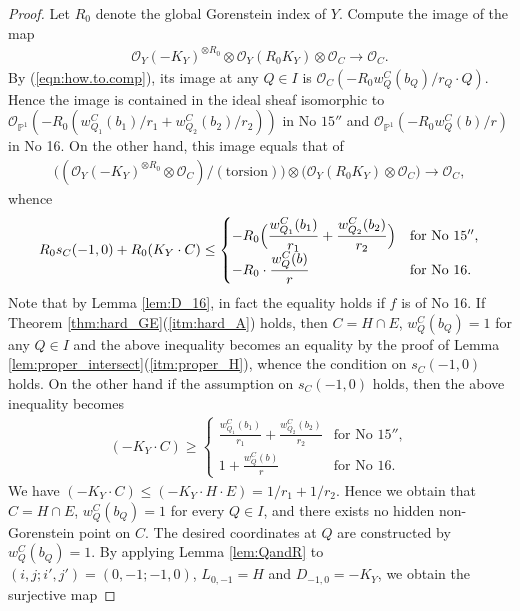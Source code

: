 \documentclass[a4paper,11pt]{amsart}
\theoremstyle{definition}
\theoremstyle{remark}
\numberwithin{equation}{section}
\newcommand{\bP}{{\mathbb P}}
\newcommand{\cO}{{\mathcal O}}
\newcommand{\torsion}{\mathrm{torsion}}
\begin{document}
\begin{proof}
Let $R_0$ denote the global Gorenstein index of $Y$.
Compute the image of the map
\begin{align*}
\cO_Y(-K_Y)^{\otimes R_0} \otimes \cO_Y(R_0K_Y) \otimes \cO_C \to \cO_C.
\end{align*}
By (\ref{eqn:how.to.comp}),
its image at any $Q \in I$ is $\cO_C(-R_0w_{Q}^C(b_Q)/r_Q \cdot Q)$.
Hence the image is contained in the ideal sheaf isomorphic to
$\cO_{\bP^1}(-R_0(w_{Q_1}^C(b_1)/r_1+w_{Q_2}^C(b_2)/r_2))$
in No $\textrm{15}''$ and $\cO_{\bP^1}(-R_0w_Q^C(b)/r)$ in No 16.
On the other hand, this image equals that of
\begin{align*}
\bigl((\cO_Y(-K_Y)^{\otimes R_0} \otimes \cO_C)/(\torsion)\bigr)
\otimes \bigl(\cO_Y(R_0K_Y) \otimes \cO_C\bigr) \to \cO_C,
\end{align*}
whence
\begin{align*}
R_0s_C(-1,0)+R_0(K_Y \cdot C)\le
\begin{cases}
\displaystyle
-R_0\Bigl(\frac{w_{Q_1}^C(b_1)}{r_1}+\frac{w_{Q_2}^C(b_2)}{r_2}\Bigr) &
\textrm{for No $\textrm{15}''$}, \\
\displaystyle -R_0 \cdot \frac{w_Q^C(b)}{r} &
\textrm{for No 16}.
\end{cases}
\end{align*}
Note that by Lemma \ref{lem:D_16},
in fact the equality holds if $f$ is of No 16.
If Theorem \ref{thm:hard_GE}(\ref{itm:hard_A}) holds,
then $C=H \cap E$, $w_Q^C(b_Q)=1$ for any $Q \in I$
and the above inequality becomes an equality
by the proof of Lemma \ref{lem:proper_intersect}(\ref{itm:proper_H}),
whence the condition on $s_C(-1,0)$ holds.
On the other hand if the assumption on $s_C(-1,0)$ holds,
then the above inequality becomes
\begin{align*}
(-K_Y \cdot C)\ge
\begin{cases}
\displaystyle \frac{w_{Q_1}^C(b_1)}{r_1}+\frac{w_{Q_2}^C(b_2)}{r_2} &
\textrm{for No $\textrm{15}''$}, \\
\displaystyle 1+\frac{w_Q^C(b)}{r} &
\textrm{for No 16}.
\end{cases}
\end{align*}
We have $(-K_Y \cdot C) \le (-K_Y \cdot H \cdot E)=1/r_1+1/r_2$.
Hence we obtain that $C=H \cap E$, $w_Q^C(b_Q)=1$ for every $Q \in I$,
and there exists no hidden non-Gorenstein point on $C$.
The desired coordinates at $Q$ are constructed by $w_Q^C(b_Q)=1$.
By applying Lemma \ref{lem:QandR} to
$(i,j;i',j')=(0,-1;-1,0)$, $L_{0,-1}=H$ and $D_{-1,0}=-K_Y$,
we obtain the surjective map

\end{proof}
\end{document}
